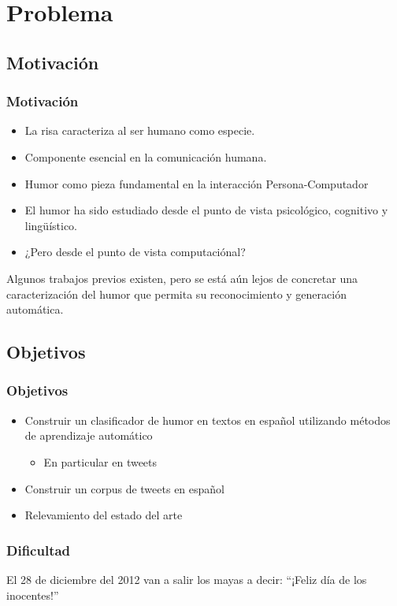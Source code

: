 \section{Problema} 

\subsection{Motivación}

\begin{frame}[allowframebreaks]
\frametitle{Motivación}
\begin{itemize}
\item La risa caracteriza al ser humano como especie.
\item Componente esencial en la comunicación humana.
\item Humor como pieza fundamental en la interacción Persona-Computador
\end{itemize}
\framebreak
\begin{itemize}
\item El humor ha sido estudiado desde el punto de vista psicológico, cognitivo y lingüístico.
\item ¿Pero desde el punto de vista computaciónal?
\end{itemize}
Algunos trabajos previos existen, pero se está aún lejos de concretar una caracterización del humor que permita su reconocimiento y generación automática.

\end{frame}

\subsection{Objetivos}

\begin{frame}
\frametitle{Objetivos}
\begin{itemize}
\item Construir un clasificador de humor en textos en español utilizando métodos de aprendizaje automático
	\begin{itemize}
		\item En particular en tweets
	\end{itemize}
\item Construir un corpus de tweets en español
\item Relevamiento del estado del arte
\end{itemize}
\end{frame}


\begin{frame}
\frametitle{Dificultad}
	El 28 de diciembre del 2012 van a salir los mayas a decir: ``¡Feliz día de los inocentes!''
\end{frame}
